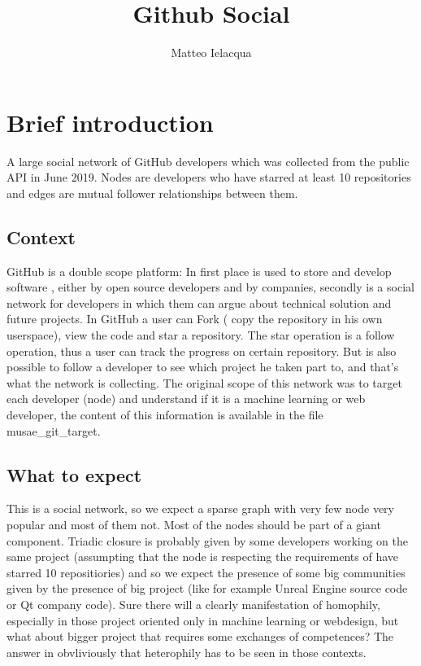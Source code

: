 \documentclass[]{article}
\begin{document}
\author{Matteo Ielacqua}
\title{Github Social}
\maketitle
    \section{Brief introduction}
    A large social network of GitHub developers which was collected from the public API in June 2019. Nodes are developers who have starred at least 10 repositories and edges are mutual follower relationships between them.
    \subsection{Context}
    GitHub is a double scope platform: In first place is used to store and develop software , either by open source developers and by companies, secondly is a social network for developers in which them can argue about technical solution and future projects. In GitHub a user can Fork ( copy the repository in his own userspace), view the code and star a repository. The star operation is a follow operation, thus a user can track the progress on certain repository. But is also possible to follow a developer to see which project he taken part to, and that's what the network is collecting. The original scope of this network was to target each developer (node) and understand if it is a machine learning or web developer, the content of this information is available in the file musae\_git\_target.
    
    \subsection{What to expect}
    This is a social network, so we expect a sparse graph with very few node very popular and most of them not. Most of the nodes should be part of a giant component. Triadic closure is probably given by some developers working on the same project (assumpting that the node is respecting the requirements of have starred 10 repositiories) and so we expect the presence of some big communities given by the presence of big project (like for example Unreal Engine source code or Qt company code). Sure there will a clearly manifestation of homophily, especially in those project oriented only in machine learning or webdesign, but what about bigger project that requires some exchanges of competences? The answer in obvliviously that heterophily has to be seen in those contexts. 
\end{document}
